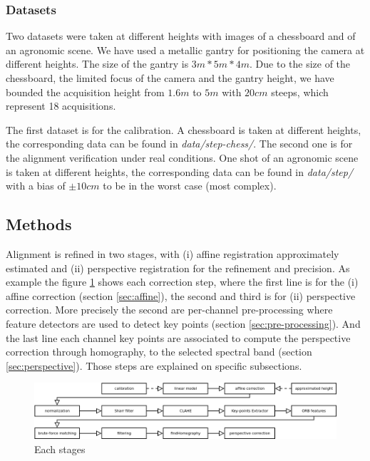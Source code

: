 \documentclass[]{elsarticle}
\begin{document}
	\subsubsection{Datasets}
	\par Two datasets were taken at different heights with images of a chessboard and of an agronomic scene.
	We have used a metallic gantry for positioning the camera at different heights.
	The size of the gantry is $3m * 5m * 4m$.
	Due to the size of the chessboard, the limited focus of the camera and the gantry height,
	we have bounded the acquisition height from $1.6m$ to $5m$ with $20cm$ steeps, which represent 18 acquisitions.
	\\
	\par The first dataset is for the calibration. A chessboard is taken at different heights, the corresponding data can be found in \textit{data/step-chess/}.
	The second one is for the alignment verification under real conditions.
	One shot of an agronomic scene is taken at different heights, the corresponding data can be found in \textit{data/step/}
	with a bias of $\pm 10cm$ to be in the worst case (most complex).
	
	\subsection{Methods}
	
	Alignment is refined in two stages, with (i) affine registration approximately estimated
	and (ii) perspective registration for the refinement and precision.
	As example the figure \ref{fig:each-stages} shows each correction step, where the first line is for the (i) affine correction (section \ref{sec:affine}), the second and third is for (ii) perspective correction.
	More precisely the second are per-channel pre-processing where feature detectors are used to detect key points (section \ref{sec:pre-processing}).
	And the last line each channel key points are associated to compute the perspective correction through homography, to the selected spectral band (section \ref{sec:perspective}).
	Those steps are explained on specific subsections.
	
	\begin{figure}[H]
		\centering
		\includegraphics[width=\linewidth]{../figures/step.png}
		\caption{Each stages}
		\label{fig:each-stages}
	\end{figure}
\end{document}
